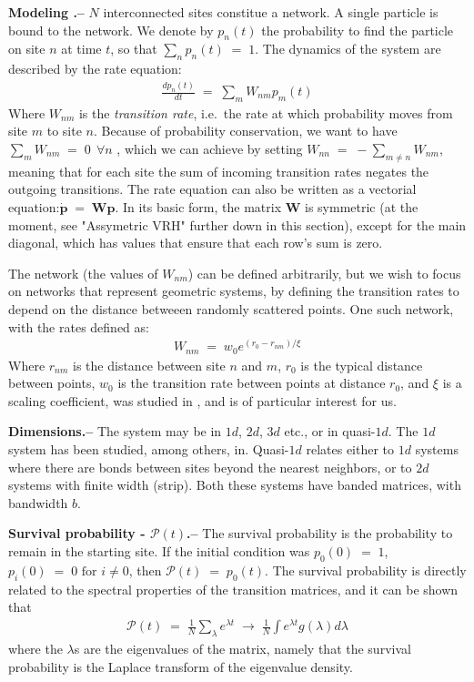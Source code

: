 \documentclass[onecolumn,fleqn,notitlepage,secnumarabic]{revtex4}
\begin{document}
{ \bf Modeling .-- } $N$ interconnected sites constitue a network. A single particle is bound to the network. We denote by $p_n(t)$ the probability to find the particle on site $n$ at time $t$, so that $\sum_n p_n(t) \;=\;1$. The dynamics of the system are described by the rate equation:
\begin{align}
\frac{dp_n(t)}{dt} \;=\; \sum_m W_{nm}p_m(t)
\end{align}
Where $W_{nm}$ is the \emph{transition rate}, i.e.\ the rate at which probability moves from site $m$ to site $n$.
Because of probability conservation, we want to have $\sum_m W_{nm} \;=\; 0 \ \ \forall n$ , which we can achieve by setting $W_{nn} \;=\; -\sum_{m\ne n} W_{nm} $, meaning that for each site the sum of incoming transition rates negates the outgoing transitions.
The rate equation can also be written as a vectorial equation:$\boldsymbol{ \dot p } \;=\; \boldsymbol{W} \boldsymbol{p}$. In its basic form, the matrix $\boldsymbol{W}$ is symmetric (at the moment, see "Assymetric VRH" further down in this section), except for the main diagonal, which has values that ensure that each row's sum is zero.

The network (the values of $W_{nm}$) can be defined arbitrarily, but we wish to focus on networks that represent geometric systems, by defining the transition rates to depend on the distance betweeen randomly scattered points\cite{Mezard:1999:NPB}. One such network, with the rates defined as:
\begin{align} \label{eq:exp_rates}
  W_{nm}\;=\; w_0 e^{(r_0-r_{nm})/ \xi}
\end{align}
Where $r_{nm}$ is the distance between site $n$ and $m$, $r_0$ is the typical distance between points, $w_0$ is the transition rate between points at distance $r_0$, and $\xi$ is a scaling coefficient, was studied in \cite{Amir:2010:PRL}, and is of particular interest for us.

{ \bf Dimensions.-- } The system may be in $1d$, $2d$, $3d$ etc., or in quasi-$1d$. The $1d$ system has been studied, among others, in\cite{Parris:1986}\cite{Alexander:1981:RMP}\cite{AslangulChvosta:1995}.  Quasi-$1d$ relates either to $1d$ systems where there are bonds between sites beyond the nearest neighbors, or to $2d$ systems with finite width (strip). Both these systems have banded matrices, with bandwidth $b$.

{ \bf Survival probability - $\mathcal{P}(t)$.--} 
The survival probability is the probability to remain in the starting site. If the initial condition was $p_0(0)\;=\;1$, $p_i(0)\;=\;0 \textrm{  for  } i\neq 0$, then $\mathcal{P}(t)\;=\; p_0(t)$. The survival probability is directly related to the spectral properties of the transition matrices, and it can be shown that 
\begin{align} \label{eq:p_t_spectrum}
\mathcal{P}(t) \;=\; \frac{1}{N}\sum_\lambda e^{\lambda t} \;\rightarrow\;\frac{1}{N}\int e^{\lambda t}g(\lambda)d\lambda
\end{align}
where the $\lambda$s are the eigenvalues of the matrix, namely that the survival probability is the Laplace transform of the eigenvalue density.
\end{document}
